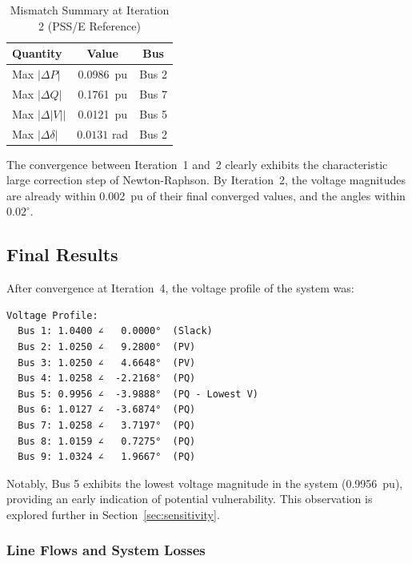 \documentclass[12pt, a4paper]{article}
\begin{document}
\begin{table}[htbp]
\centering
\caption{Mismatch Summary at Iteration 2 (PSS/E Reference)}
\label{tab:iter2_mismatch}
\begin{tabular}{l c c}
\toprule
\textbf{Quantity} & \textbf{Value} & \textbf{Bus} \\
\midrule
Max $|\Delta P|$ & 0.0986~pu & Bus 2 \\
Max $|\Delta Q|$ & 0.1761~pu & Bus 7 \\
Max $|\Delta |V||$ & 0.0121~pu & Bus 5 \\
Max $|\Delta \delta|$ & $0.0131$ rad & Bus 2 \\
\bottomrule
\end{tabular}
\end{table}

The convergence between Iteration~1 and~2 clearly exhibits the characteristic large correction step of Newton-Raphson. By Iteration~2, the voltage magnitudes are already within 0.002~pu of their final converged values, and the angles within $0.02^{\circ}$.

\subsection{Final Results}
After convergence at Iteration~4, the voltage profile of the system was:

\begin{lstlisting}
Voltage Profile:
  Bus 1: 1.0400 ∠   0.0000°  (Slack)
  Bus 2: 1.0250 ∠   9.2800°  (PV)
  Bus 3: 1.0250 ∠   4.6648°  (PV)
  Bus 4: 1.0258 ∠  -2.2168°  (PQ)
  Bus 5: 0.9956 ∠  -3.9888°  (PQ - Lowest V)
  Bus 6: 1.0127 ∠  -3.6874°  (PQ)
  Bus 7: 1.0258 ∠   3.7197°  (PQ)
  Bus 8: 1.0159 ∠   0.7275°  (PQ)
  Bus 9: 1.0324 ∠   1.9667°  (PQ)
\end{lstlisting}

Notably, Bus 5 exhibits the lowest voltage magnitude in the system (0.9956~pu), providing an early indication of potential vulnerability. This observation is explored further in Section~\ref{sec:sensitivity}.

\subsubsection{Line Flows and System Losses}
\end{document}
